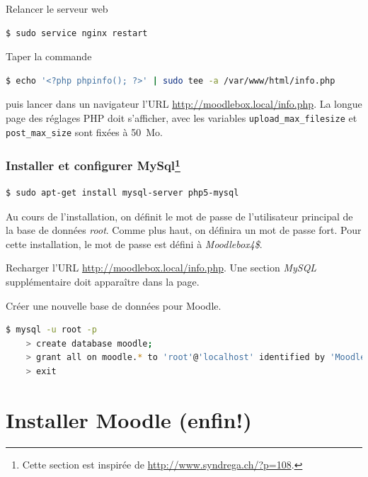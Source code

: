 \documentclass[11pt]{article}
\begin{document}
Relancer le serveur web
\begin{lstlisting}[language=bash]
$ sudo service nginx restart
\end{lstlisting}

\begin{verification}
Taper la commande
\begin{lstlisting}[language=bash]
$ echo '<?php phpinfo(); ?>' | sudo tee -a /var/www/html/info.php
\end{lstlisting}
puis lancer dans un navigateur l'URL \url{http://moodlebox.local/info.php}. La longue page des réglages PHP doit s'afficher, avec les variables \lstinline{upload_max_filesize} et \lstinline{post_max_size} sont fixées à 50~Mo.
\end{verification}

\subsubsection[Installer et configurer MySql]{Installer et configurer MySql\footnote{Cette section est inspirée de \url{http://www.syndrega.ch/?p=108}.}}

\begin{lstlisting}[language=bash]
$ sudo apt-get install mysql-server php5-mysql
\end{lstlisting}

Au cours de l'installation, on définit le mot de passe de l'utilisateur principal de la base de données \emph{root}. Comme plus haut,  on définira un mot de passe fort. Pour cette installation, le mot de passe est défini à \emph{Moodlebox4\$}.

\begin{verification}
Recharger l'URL \url{http://moodlebox.local/info.php}. Une section \emph{MySQL} supplémentaire doit apparaître dans la page.
\end{verification}

Créer une nouvelle base de données pour Moodle.

\begin{lstlisting}[language=bash]
$ mysql -u root -p
    > create database moodle;
    > grant all on moodle.* to 'root'@'localhost' identified by 'Moodlebox4$';
    > exit
\end{lstlisting}

\section{Installer Moodle (enfin!)}
\end{document}
